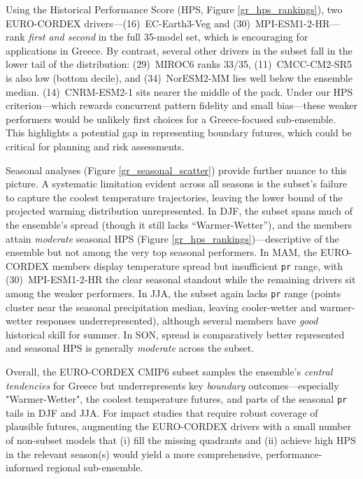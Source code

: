 \documentclass[pdflatex,sn-chicago]{sn-jnl}%
\theoremstyle{thmstyleone}%
\theoremstyle{thmstyletwo}%
\theoremstyle{thmstylethree}%
\begin{document}
Using the Historical Performance Score (HPS, Figure \ref{gr_hps_rankings}), two EURO-CORDEX drivers---(16)~EC-Earth3-Veg and (30)~MPI-ESM1-2-HR---rank \emph{first and second} in the full 35-model set, which is encouraging for applications in Greece. By contrast, several other drivers in the subset fall in the lower tail of the distribution: (29)~MIROC6 ranks 33/35, (11)~CMCC-CM2-SR5 is also low (bottom decile), and (34)~NorESM2-MM lies well below the ensemble median. (14)~CNRM-ESM2-1 sits nearer the middle of the pack. Under our HPS criterion---which rewards concurrent pattern fidelity and small bias---these weaker performers would be unlikely first choices for a Greece-focused sub-ensemble. This highlights a potential gap in representing boundary futures, which could be critical for planning and risk assessments.

Seasonal analyses (Figure \ref{gr_seasonal_scatter}) provide further nuance to this picture. A systematic limitation evident across all seasons is the subset's failure to capture the coolest temperature trajectories, leaving the lower bound of the projected warming distribution unrepresented. In DJF, the subset spans much of the ensemble’s spread (though it still lacks ``Warmer-Wetter''), and the members attain \emph{moderate} seasonal HPS (Figure \ref{gr_hps_rankings})---descriptive of the ensemble but not among the very top seasonal performers. In MAM, the EURO-CORDEX members display temperature spread but insufficient \texttt{pr} range, with (30)~MPI-ESM1-2-HR the clear seasonal standout while the remaining drivers sit among the weaker performers. In JJA, the subset again lacks \texttt{pr} range (points cluster near the seasonal precipitation median, leaving cooler-wetter and warmer-wetter responses underrepresented), although several members have \emph{good} historical skill for summer. In SON, spread is comparatively better represented and seasonal HPS is generally \emph{moderate} across the subset.

Overall, the EURO-CORDEX CMIP6 subset samples the ensemble’s \emph{central tendencies} for Greece but underrepresents key \emph{boundary} outcomes---especially "Warmer-Wetter", the coolest temperature futures, and parts of the seasonal \texttt{pr} tails in DJF and JJA. For impact studies that require robust coverage of plausible futures, augmenting the EURO-CORDEX drivers with a small number of non-subset models that (i) fill the missing quadrants and (ii) achieve high HPS in the relevant season(s) would yield a more comprehensive, performance-informed regional sub-ensemble.
\end{document}
